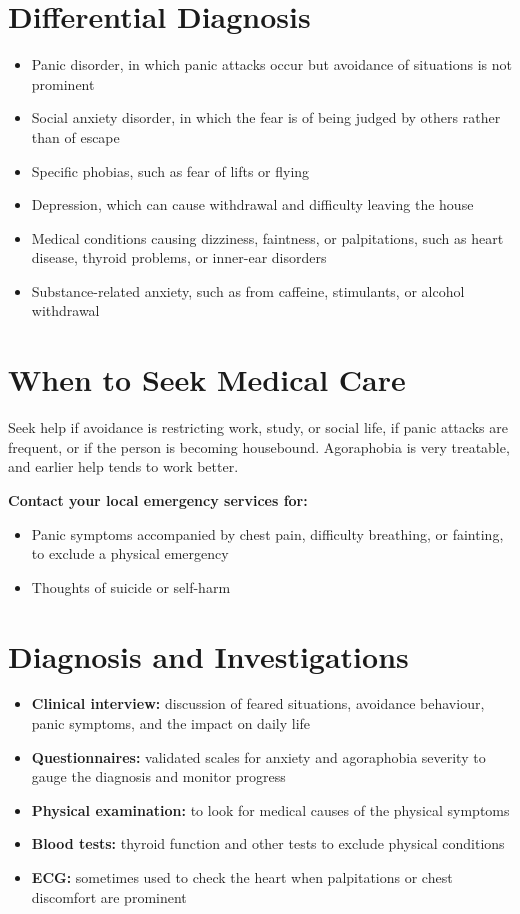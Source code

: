 \section*{Differential Diagnosis}
\begin{itemize}
    \item Panic disorder, in which panic attacks occur but avoidance of situations is not prominent
    \item Social anxiety disorder, in which the fear is of being judged by others rather than of escape
    \item Specific phobias, such as fear of lifts or flying
    \item Depression, which can cause withdrawal and difficulty leaving the house
    \item Medical conditions causing dizziness, faintness, or palpitations, such as heart disease, thyroid problems, or inner-ear disorders
    \item Substance-related anxiety, such as from caffeine, stimulants, or alcohol withdrawal
\end{itemize}

\section*{When to Seek Medical Care}
Seek help if avoidance is restricting work, study, or social life, if panic attacks are frequent, or if the person is becoming housebound. Agoraphobia is very treatable, and earlier help tends to work better.

\textbf{Contact your local emergency services for:}
\begin{itemize}
    \item Panic symptoms accompanied by chest pain, difficulty breathing, or fainting, to exclude a physical emergency
    \item Thoughts of suicide or self-harm
\end{itemize}

\section*{Diagnosis and Investigations}
\begin{itemize}
    \item \textbf{Clinical interview:} discussion of feared situations, avoidance behaviour, panic symptoms, and the impact on daily life
    \item \textbf{Questionnaires:} validated scales for anxiety and agoraphobia severity to gauge the diagnosis and monitor progress
    \item \textbf{Physical examination:} to look for medical causes of the physical symptoms
    \item \textbf{Blood tests:} thyroid function and other tests to exclude physical conditions
    \item \textbf{ECG:} sometimes used to check the heart when palpitations or chest discomfort are prominent
\end{itemize}

